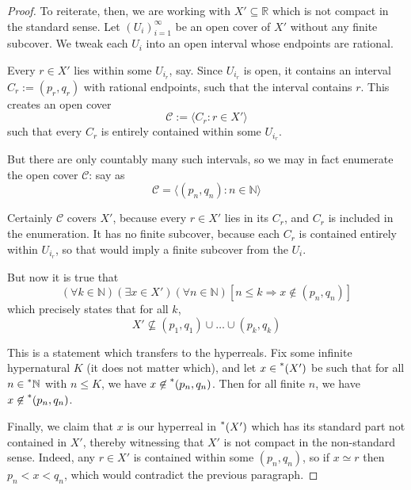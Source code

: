 \documentclass[11pt]{amsart}
\theoremstyle{remark}
\newcommand{\hyp}[1][\mathbb{R}]{\prescript{*}{}{#1}}
\newcommand{\near}{\simeq}
\begin{document}
\begin{proof}
To reiterate, then, we are working with $X' \subseteq \mathbb{R}$ which is not compact in the standard sense.
Let $(U_i)_{i=1}^{\infty}$ be an open cover of $X'$ without any finite subcover.
We tweak each $U_i$ into an open interval whose endpoints are rational.

Every $r \in X'$ lies within some $U_{i_r}$, say.
Since $U_{i_r}$ is open, it contains an interval $C_r := (p_r, q_r)$ with rational endpoints, such that the interval contains $r$.
This creates an open cover $$\mathcal{C} := \langle C_r : r \in X' \rangle$$
such that every $C_r$ is entirely contained within some $U_{i_r}$.

But there are only countably many such intervals, so we may in fact enumerate the open cover $\mathcal{C}$: say as $$\mathcal{C} = \langle (p_n, q_n) : n \in \mathbb{N} \rangle$$

Certainly $\mathcal{C}$ covers $X'$, because every $r \in X'$ lies in its $C_r$, and $C_r$ is included in the enumeration.
It has no finite subcover, because each $C_r$ is contained entirely within $U_{i_r}$, so that would imply a finite subcover from the $U_i$.

But now it is true that $$(\forall k \in \mathbb{N})(\exists x \in X')(\forall n \in \mathbb{N})[n \leq k \Rightarrow x \not \in (p_n, q_n)]$$
which precisely states that for all $k$, $$X' \not \subseteq (p_1, q_1) \cup \dots \cup (p_k, q_k)$$

This is a statement which transfers to the hyperreals.
Fix some infinite hypernatural $K$ (it does not matter which), and let $x \in \hyp[(X')]$ be such that for all $n \in \hyp[\mathbb{N}]$ with $n \leq K$, we have $x \not \in \hyp[(] p_n, q_n)$.
Then for all finite $n$, we have $x \not \in \hyp[(] p_n, q_n)$.

Finally, we claim that $x$ is our hyperreal in $\hyp[(X')]$ which has its standard part not contained in $X'$, thereby witnessing that $X'$ is not compact in the non-standard sense.
Indeed, any $r \in X'$ is contained within some $(p_n, q_n)$, so if $x \near r$ then $p_n < x < q_n$, which would contradict the previous paragraph.
\end{proof}
\end{document}

